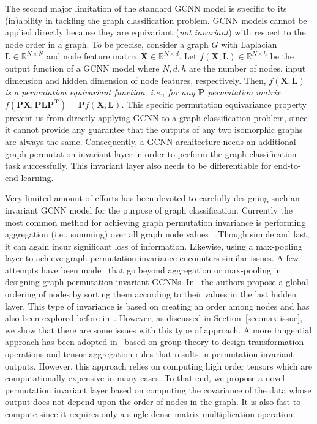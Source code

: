 \documentclass{article}
\begin{document}
The second major limitation of the standard GCNN model is specific to its (in)ability in tackling the graph classification problem.  GCNN models cannot be applied   directly   because they are equivariant  ({\em not invariant}) with respect to the node order in a graph. To be precise, consider a graph $G$  with Laplacian $\mathbf{L}\in \mathbb{R}^{N \times N}$    and node feature matrix $\mathbf{X}\in \mathbb{R}^{N \times d}$. Let $f(\mathbf{X}, \mathbf{L}) \in \mathbb{R}^{N \times h} $ be the output function of a GCNN model where $N, d, h$ are the number of nodes, input dimension and  hidden dimension of node features, respectively.  Then,
\textit{$f(\mathbf{X}, \mathbf{L})$ is a permutation equivariant function, i.e., for any $\mathbf{P}$   permutation matrix $f(\mathbf{P}\mathbf{X}, \mathbf{PLP^{T}}) = \mathbf{P}f(\mathbf{X}, \mathbf{L})$. }
This specific permutation equivariance property prevent us from directly applying GCNN to a graph classification problem, since it cannot provide any guarantee that the outputs of  any two isomorphic graphs are always the same. Consequently,  a GCNN architecture needs an additional graph permutation invariant layer in order to perform the  graph classification task successfully. This invariant layer  also   needs to be differentiable  for end-to-end learning.

Very limited amount of efforts has been devoted to carefully designing such an invariant GCNN model for the purpose of graph classification. Currently the most common  method for achieving graph permutation invariance  is performing aggregation (i.e., summing) over all graph node values~\cite{atwood2016diffusion, dai2016discriminative, zhao2018substructure, simonovsky2017dynamic}. Though  simple and fast, it can again incur significant loss of information.  Likewise, using a max-pooling layer to achieve graph permutation invariance encounters similar issues. A few attempts have been made~\cite{zhang2018end, kondor2018covariant} that go beyond aggregation or max-pooling in designing graph permutation invariant GCNNs. In~\cite{zhang2018end} the authors  propose a global ordering of nodes by sorting them according to their   values in the last hidden layer. This type of invariance is based on  creating an order among nodes and has also been explored before in~\cite{niepert2016learning}. However, as discussed in Section~\ref{sec:max-issue}, we show that there  are some issues with this type of approach. A more tangential approach  has been adopted in~\cite{kondor2018covariant} based on group theory to  design transformation operations and tensor aggregation rules that results in permutation invariant outputs. However, this approach relies on computing high order tensors which are computationally  expensive in many cases. 
To that end, we propose a novel permutation invariant layer based on computing the covariance of the data whose output does not depend upon the order of nodes in the graph. It is also fast to compute since it requires only a single dense-matrix multiplication operation.
\end{document}
